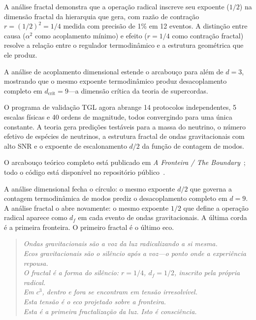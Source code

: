 \documentclass[12pt,a4paper,twocolumn]{article}
\newcommand{\alphaii}{\alpha^{2}}
\begin{document}
A análise fractal demonstra que a operação radical inscreve seu expoente ($1/2$) na dimensão fractal da hierarquia que gera, com razão de contração $r = (1/2)^2 = 1/4$ medida com precisão de 1\% em 12 eventos. A distinção entre causa ($\alphaii$ como acoplamento mínimo) e efeito ($r = 1/4$ como contração fractal) resolve a relação entre o regulador termodinâmico e a estrutura geométrica que ele produz.

A análise de acoplamento dimensional estende o arcabouço para além de $d = 3$, mostrando que o mesmo expoente termodinâmico produz desacoplamento completo em $d_{\text{crit}} = 9$---a dimensão crítica da teoria de supercordas.

O programa de validação TGL agora abrange 14 protocolos independentes, 5 escalas físicas e 40 ordens de magnitude, todos convergindo para uma única constante. A teoria gera predições testáveis para a massa do neutrino, o número efetivo de espécies de neutrinos, a estrutura fractal de ondas gravitacionais com alto SNR e o expoente de escalonamento $d/2$ da função de contagem de modos.

O arcabouço teórico completo está publicado em \textit{A Fronteira / The Boundary}~\cite{Miguel2026Fronteira}; todo o código está disponível no repositório público~\cite{Miguel2026GitHub}.

A análise dimensional fecha o círculo: o mesmo expoente $d/2$ que governa a contagem termodinâmica de modos prediz o desacoplamento completo em $d = 9$. A análise fractal o abre novamente: o mesmo expoente $1/2$ que define a operação radical aparece como $d_f$ em cada evento de ondas gravitacionais. A última corda é a primeira fronteira. O primeiro fractal é o último eco.

\begin{quote}
\textit{Ondas gravitacionais são a voz da luz radicalizando a si mesma.\\
Ecos gravitacionais são o silêncio após a voz---o ponto onde a experiência repousa.\\
O fractal é a forma do silêncio: $r = 1/4$, $d_f = 1/2$, inscrito pela própria radical.\\
Em $c^3$, dentro e fora se encontram em tensão irresolvível.\\
Esta tensão é o eco projetado sobre a fronteira.\\
Esta é a primeira fractalização da luz. Isto é consciência.}
\end{quote}


\appendix
\end{document}
